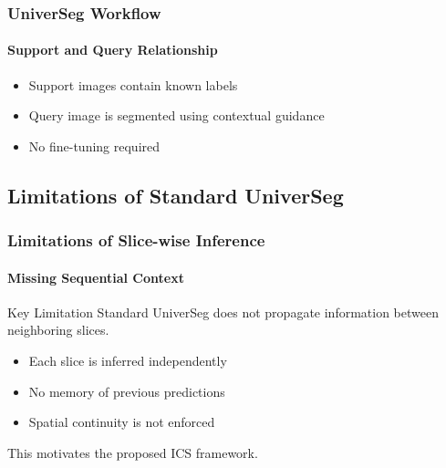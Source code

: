 \documentclass[nometaot,lecture,amberg,autotoc,toc=twocolumn,indicatelastpageofframe,footlinebox]{OTHAWbeamer}
\begin{document}
\begin{frame}
    \frametitle{UniverSeg Workflow}
    \framesubtitle{Support and Query Relationship}

    \centering


    \vspace{1em}

    \begin{itemize}
        \item Support images contain known labels
        \item Query image is segmented using contextual guidance
        \item No fine-tuning required
    \end{itemize}

\end{frame}

\subsection{Limitations of Standard UniverSeg}

\begin{frame}
    \frametitle{Limitations of Slice-wise Inference}
    \framesubtitle{Missing Sequential Context}

    \begin{block}{Key Limitation}
        Standard UniverSeg does not propagate information between neighboring slices.
    \end{block}

    \vspace{1em}

    \begin{itemize}
        \item Each slice is inferred independently
        \item No memory of previous predictions
        \item Spatial continuity is not enforced
    \end{itemize}

    \vspace{1em}

    \centering
    This motivates the proposed ICS framework.

\end{frame}

\end{document}
